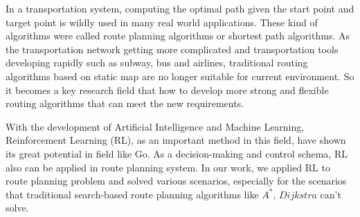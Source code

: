 \documentclass{standalone}
\begin{document}
\begin{englishabstract}

	In a transportation system, computing the optimal path given the start point and target point is wildly used in many real world applications. These kind of algorithms were called route planning algorithms or shortest path algorithms. As the transportation network getting more complicated and transportation tools developing rapidly such as subway, bus and airlines, traditional routing algorithms based on static map are no longer suitable for current environment. So it becomes a key research field that how to develop more strong and flexible routing algorithms that can meet the new requirements.

    With the development of Artificial Intelligence and Machine Learning, Reinforcement Learning (RL), as an important method in this field, have shown its great potential in field like Go. As a decision-making and control schema, RL also can be applied in route planning system. In our work, we applied RL to route planning problem and solved various scenarios, especially for the scenarios that traditional search-based route planning algorithms like $A^*$, $Dijkstra$ can't solve.
    
  
\end{englishabstract}
\end{document}
